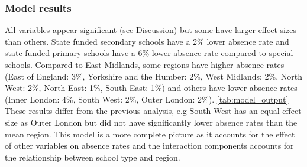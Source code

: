 \documentclass{article}
\begin{document}
    
        \subsubsection*{Model results}
        All variables appear significant (see Discussion) but some have larger effect sizes than others. State funded secondary schools have a 2\% lower absence rate and state funded primary schools have a 6\% lower absence rate compared to special schools. Compared to East Midlands, some regions have higher absence rates (East of England: 3\%, Yorkshire and the Humber: 2\%, West Midlands: 2\%,  North West: 2\%, North East: 1\%, South East: 1\%) and others have lower absence rates (Inner London: 4\%, South West: 2\%, Outer London: 2\%). \ref{tab:model_output} These results differ from the previous analysis, e.g South West has an equal effect size as Outer London but did not have significantly lower absence rates than the mean region. This model is a more complete picture as it accounts for the effect of other variables on absence rates and the interaction components accounts for the relationship between school type and region. 
\end{document}
